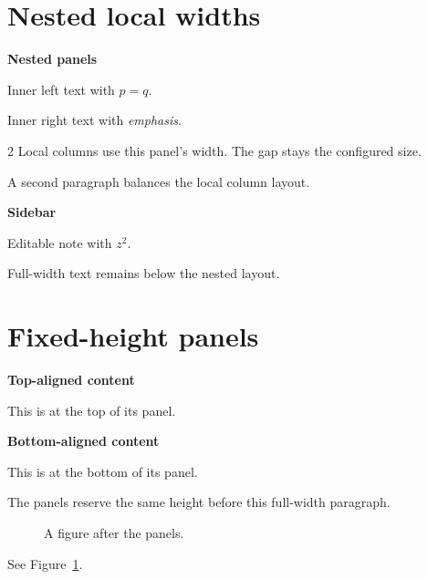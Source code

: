 \documentclass[11pt,a4paper]{article}
\begin{document}
\section{Nested local widths}
\noindent
\begin{minipage}[t]{0.62\linewidth}
\textbf{Nested panels}\par
\noindent\begin{minipage}[t]{0.46\linewidth}Inner left text with \(p=q\).\end{minipage}\hfill
\begin{minipage}[t]{0.46\linewidth}Inner right text with \textit{emphasis}.\end{minipage}
\par\medskip
\begin{multicols}{2}
Local columns use this panel's width. The gap stays the configured size.

A second paragraph balances the local column layout.
\end{multicols}
\end{minipage}\hfill
\begin{minipage}[t]{0.32\linewidth}
\textbf{Sidebar}\par
\begin{tcolorbox}[colback=green!5,colframe=green!40!black]
Editable note with \(z^2\).
\end{tcolorbox}
\end{minipage}
\par\bigskip
Full-width text remains below the nested layout.
\clearpage
\section{Fixed-height panels}
\noindent
\begin{minipage}[t][36mm][t]{0.46\linewidth}
\textbf{Top-aligned content}\par This is at the top of its panel.
\end{minipage}\hfill
\begin{minipage}[t][36mm][b]{0.46\linewidth}
\textbf{Bottom-aligned content}\par This is at the bottom of its panel.
\end{minipage}
\par
The panels reserve the same height before this full-width paragraph.
\begin{figure}[htbp]\centering
{}
\caption{A figure after the panels.}\label{fig:layout}
\end{figure}
See Figure~\ref{fig:layout}.
\end{document}
